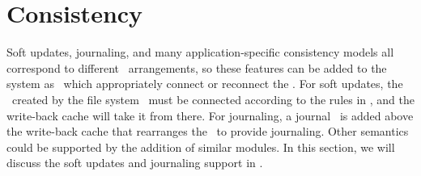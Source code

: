 \section{Consistency}
\label{sec:consistency}

Soft updates, journaling, and many application-specific consistency models all
correspond to different \chdesc\ arrangements, so these features can be added to
the system as \modules\ which appropriately connect or reconnect the \chdescs.
For soft updates, the \chdescs\ created by the file system \module\ must be
connected according to the rules in \cite{ganger00soft}, and the write-back
cache will take it from there. For journaling, a journal \module\ is added above
the write-back cache that rearranges the \chdescs\ to provide journaling. Other
semantics could be supported by the addition of similar modules. In this
section, we will discuss the soft updates and journaling support in \Kudos.



